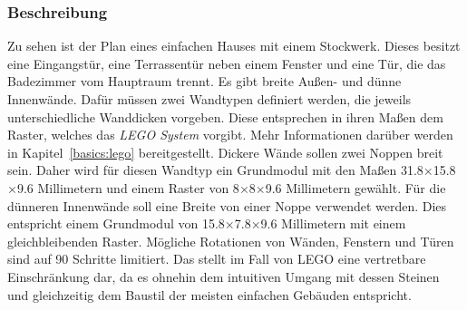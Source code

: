 \subsubsection*{Beschreibung}
Zu sehen ist der Plan eines einfachen Hauses mit einem Stockwerk.
Dieses besitzt eine Eingangstür, eine Terrassentür neben einem Fenster und eine Tür, die das Badezimmer vom Hauptraum trennt.
Es gibt breite Außen- und dünne Innenwände.
Dafür müssen zwei Wandtypen definiert werden, die jeweils unterschiedliche Wanddicken vorgeben.
Diese entsprechen in ihren Maßen dem Raster, welches das \textit{LEGO System} vorgibt.
Mehr Informationen darüber werden in Kapitel~\ref{basics:lego} bereitgestellt.
Dickere Wände sollen zwei Noppen breit sein.
Daher wird für diesen Wandtyp ein Grundmodul mit den Maßen 31.8$\times$15.8$\times$9.6 Millimetern und einem Raster von 8$\times$8$\times$9.6 Millimetern gewählt.
Für die dünneren Innenwände soll eine Breite von einer Noppe verwendet werden.
Dies entspricht einem Grundmodul von 15.8$\times$7.8$\times$9.6 Millimetern mit einem gleichbleibenden Raster.
Mögliche Rotationen von Wänden, Fenstern und Türen sind auf 90\textdegree{} Schritte limitiert.
Das stellt im Fall von LEGO eine vertretbare Einschränkung dar, da es ohnehin dem intuitiven Umgang mit dessen Steinen und gleichzeitig dem Baustil der meisten einfachen Gebäuden entspricht.


